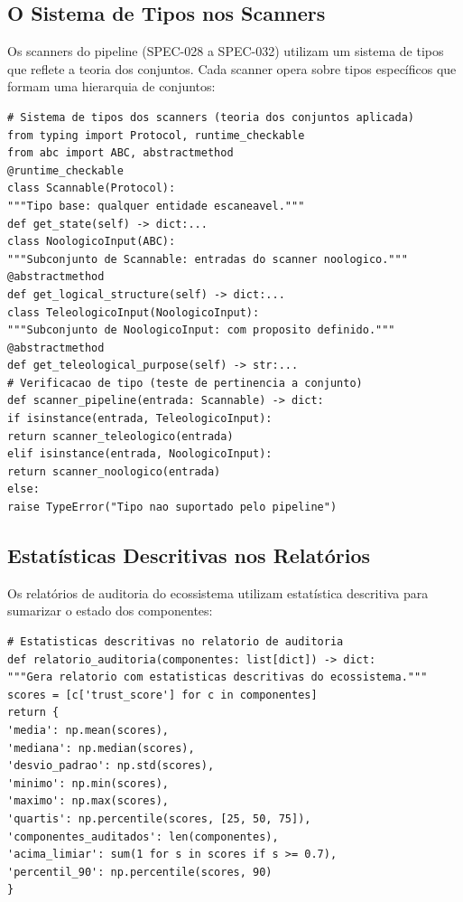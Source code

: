 \subsection{O Sistema de Tipos nos Scanners}
Os scanners do pipeline (SPEC-028 a SPEC-032) utilizam um sistema de tipos
que reflete a teoria dos conjuntos. Cada scanner opera sobre tipos
específicos que formam uma hierarquia de conjuntos:
\begin{lstlisting}[style=pythonstyle]
# Sistema de tipos dos scanners (teoria dos conjuntos aplicada)
from typing import Protocol, runtime_checkable
from abc import ABC, abstractmethod
@runtime_checkable
class Scannable(Protocol):
"""Tipo base: qualquer entidade escaneavel."""
def get_state(self) -> dict:...
class NoologicoInput(ABC):
"""Subconjunto de Scannable: entradas do scanner noologico."""
@abstractmethod
def get_logical_structure(self) -> dict:...
class TeleologicoInput(NoologicoInput):
"""Subconjunto de NoologicoInput: com proposito definido."""
@abstractmethod
def get_teleological_purpose(self) -> str:...
# Verificacao de tipo (teste de pertinencia a conjunto)
def scanner_pipeline(entrada: Scannable) -> dict:
if isinstance(entrada, TeleologicoInput):
return scanner_teleologico(entrada)
elif isinstance(entrada, NoologicoInput):
return scanner_noologico(entrada)
else:
raise TypeError("Tipo nao suportado pelo pipeline")
\end{lstlisting}
\subsection{Estatísticas Descritivas nos Relatórios}
Os relatórios de auditoria do ecossistema utilizam estatística descritiva
para sumarizar o estado dos componentes:
\begin{lstlisting}[style=pythonstyle]
# Estatisticas descritivas no relatorio de auditoria
def relatorio_auditoria(componentes: list[dict]) -> dict:
"""Gera relatorio com estatisticas descritivas do ecossistema."""
scores = [c['trust_score'] for c in componentes]
return {
'media': np.mean(scores),
'mediana': np.median(scores),
'desvio_padrao': np.std(scores),
'minimo': np.min(scores),
'maximo': np.max(scores),
'quartis': np.percentile(scores, [25, 50, 75]),
'componentes_auditados': len(componentes),
'acima_limiar': sum(1 for s in scores if s >= 0.7),
'percentil_90': np.percentile(scores, 90)
}
\end{lstlisting}
